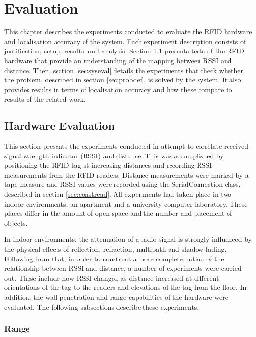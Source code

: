 \chapter{Evaluation}
\label{ch:evaluation}

This chapter describes the experiments conducted to evaluate the RFID hardware and localisation accuracy of the system. Each experiment description consists of justification, setup, results, and analysis. Section \ref{sec:hardeval} presents tests of the RFID hardware that provide an understanding of the mapping between RSSI and distance. Then, section \ref{sec:syseval} details the experiments that check whether the problem, described in section \ref{sec:probdef}, is solved by the system. It also provides results in terms of localisation accuracy and how these compare to results of the related work.

\section{Hardware Evaluation}
\label{sec:hardeval}

This section presents the experiments conducted in attempt to correlate received signal strength indicator (RSSI) and distance. This was accomplished by positioning the RFID tag at increasing distances and recording RSSI measurements from the RFID readers. Distance measurements were marked by a tape measure and RSSI values were recorded using the \textsf{SerialConnection} class, described in section \ref{sec:constread}. All experiments had taken place in two indoor environments, an apartment and a university computer laboratory. These places differ in the amount of open space and the number and placement of objects.

In indoor environments, the attenuation of a radio signal is strongly influenced by the physical effects of reflection, refraction, multipath and shadow fading. Following from that, in order to construct a more complete notion of the relationship between RSSI and distance, a number of experiments were carried out. These include how RSSI changed as distance increased at different orientations of the tag to the readers and elevations of the tag from the floor. In addition, the wall penetration and range capabilities of the hardware were evaluated. The following subsections describe these experiments.

\subsection{Range}
\label{subsec:range}

